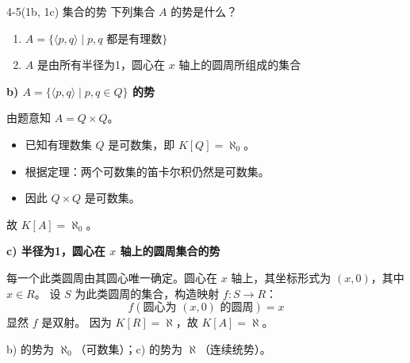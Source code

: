\documentclass[11pt]{article}
\begin{document}
\begin{question}{4-5(1b, 1c) 集合的势}
  下列集合 $A$ 的势是什么？
  \begin{enumerate}
    \item[b)] $A = \{\langle p, q \rangle \mid p, q \text{ 都是有理数}\}$
    \item[c)] $A$ 是由所有半径为1，圆心在 $x$ 轴上的圆周所组成的集合
  \end{enumerate}

  \begin{answer}
    \textbf{b) $A = \{\langle p, q \rangle \mid p, q \in Q\}$ 的势}

    由题意知 $A = Q \times Q$。
    \begin{itemize}
      \item 已知有理数集 $Q$ 是可数集，即 $K[Q] = \aleph_0$。
      \item 根据定理：两个可数集的笛卡尔积仍然是可数集。
      \item 因此 $Q \times Q$ 是可数集。
    \end{itemize}
    故 $K[A] = \aleph_0$。

    \vspace{1em}
    \textbf{c) 半径为1，圆心在 $x$ 轴上的圆周集合的势}

    每一个此类圆周由其圆心唯一确定。圆心在 $x$ 轴上，其坐标形式为 $(x, 0)$，其中 $x \in R$。
    设 $S$ 为此类圆周的集合，构造映射 $f: S \to R$：
    $$f(\text{圆心为 } (x, 0) \text{ 的圆周}) = x$$
    显然 $f$ 是双射。
    因为 $K[R] = \aleph$，故 $K[A] = \aleph$。

    \begin{info}[总结:]
      b) 的势为 $\aleph_0$（可数集）；c) 的势为 $\aleph$（连续统势）。
    \end{info}
  \end{answer}
\end{question}

\end{document}

